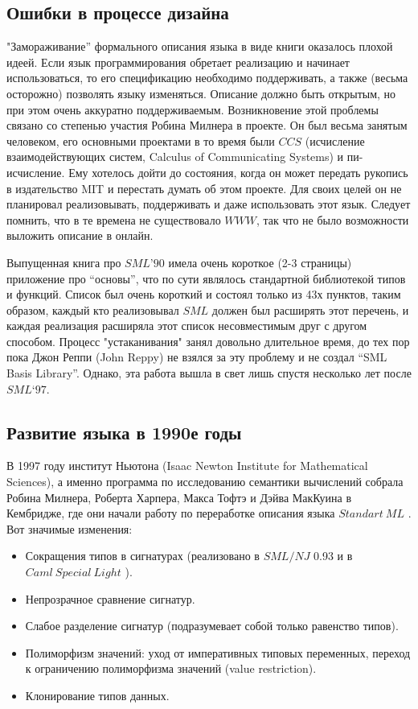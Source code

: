 \documentclass[14pt]{matmex-diploma-custom}
\begin{document}
\subsection{Ошибки в процессе дизайна}
"Замораживание” формального описания языка в виде книги оказалось плохой идеей. Если язык программирования обретает реализацию и начинает использоваться, то его спецификацию необходимо поддерживать, а также (весьма осторожно) позволять языку изменяться. Описание должно быть открытым, но при этом очень аккуратно поддерживаемым.
Возникновение этой проблемы связано со степенью участия Робина  Милнера в проекте. Он был весьма занятым человеком, его основными проектами в то время были $CCS$ (исчисление взаимодействующих систем, Calculus of Communicating Systems) и пи-исчисление. Ему хотелось дойти до состояния, когда он может передать рукопись в издательство MIT  и перестать думать об этом проекте. Для своих целей он не планировал реализовывать, поддерживать и даже использовать этот язык. Следует помнить, что в те времена не существовало $WWW$, так что не было возможности выложить описание в онлайн.

Выпущенная книга про $SML’90$ имела очень короткое (2-3 страницы) приложение про “основы”, что по сути являлось стандартной библиотекой типов и функций. Список был очень короткий и состоял только из 43х пунктов, таким образом, каждый кто реализовывал $SM\!L$ должен был расширять этот перечень, и каждая реализация расширяла этот список несовместимым друг с другом способом. Процесс "устаканивания" занял довольно длительное время, до тех пор пока Джон Реппи (John Reppy) не взялся за эту проблему и не создал “SML Basis Library”. Однако, эта работа вышла в свет лишь спустя несколько лет после $SML‘97$.


\subsection{Развитие языка в 1990е годы}
В 1997 году институт Ньютона (Isaac Newton Institute for Mathematical Sciences), а именно программа по исследованию семантики вычислений собрала Робина Милнера, Роберта Харпера, Макса Тофтэ и Дэйва МакКуина в Кембридже, где они начали работу по переработке описания языка $Standart\ M\!L$ \cite{sml97}. Вот значимые изменения:

\begin{itemize}
\item Сокращения типов в сигнатурах (реализовано в $SML/N\!J$ 0.93 и в $Caml\ Special\ Light$ \cite{leroy1}).
\item Непрозрачное сравнение сигнатур.
\item Слабое разделение сигнатур (подразумевает собой только равенство типов).
\item Полиморфизм значений: уход от императивных типовых переменных, переход к ограничению полиморфизма значений (value restriction).
\item Клонирование типов данных.
\end{itemize}
\end{document}
